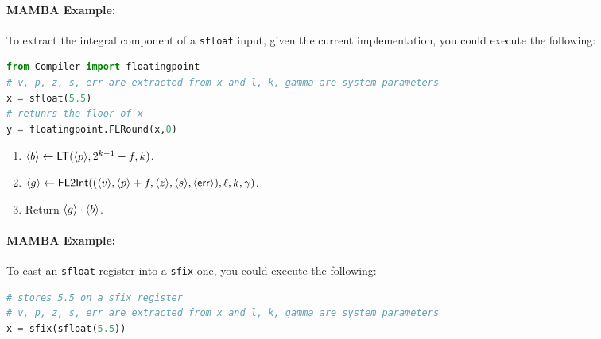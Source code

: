 \paragraph{MAMBA Example:} To extract the integral component of a \verb|sfloat| input,  
given the current implementation, you could execute the following: 
\begin{lstlisting}[language={python}]
from Compiler import floatingpoint
# v, p, z, s, err are extracted from x and l, k, gamma are system parameters 
x = sfloat(5.5)
# retunrs the floor of x
y = floatingpoint.FLRound(x,0)
\end{lstlisting}
\fi

\begin{enumerate}
\item $\langle b \rangle \leftarrow \mathsf{LT}(\langle p \rangle,2^{k-1}-f,k)$.
\item $\langle g \rangle \leftarrow \mathsf{FL2Int}((\langle v \rangle,\langle p \rangle+f,\langle z \rangle,
	\langle s \rangle,\langle \mathsf{err} \rangle),\ell,k,\gamma)$.
\item Return $\langle g \rangle \cdot \langle b \rangle$.
\end{enumerate}
\paragraph{MAMBA Example:} To cast an \verb|sfloat| register into a \verb|sfix| one, you could execute the following: 
\begin{lstlisting}[language={python}]
# stores 5.5 on a sfix register
# v, p, z, s, err are extracted from x and l, k, gamma are system parameters 
x = sfix(sfloat(5.5))
\end{lstlisting}


